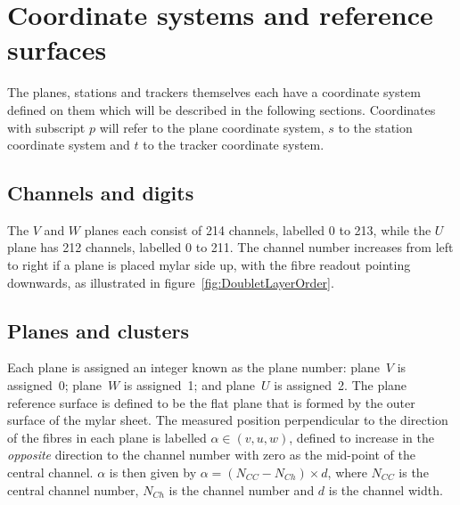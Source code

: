 \section{Coordinate systems and reference surfaces}
\label{sec:Coordinates}

  The planes, stations and trackers themselves each have a coordinate system defined on them which will be described in the following sections. Coordinates with subscript $p$ will refer to the plane coordinate system, $s$ to the station coordinate system and $t$ to the tracker coordinate system.

  \subsection{Channels and digits}
  The $V$ and $W$ planes each consist of 214 channels, labelled 0 to 213, while the $U$ plane has 212 channels, labelled 0 to 211.  The channel number increases from left to right if a plane is placed mylar side up, with the fibre readout pointing downwards, as illustrated in figure~\ref{fig:DoubletLayerOrder}.

  \subsection{Planes and clusters}
  \label{subsec:PlaneAndClusters}
  Each plane is assigned an integer known as the plane number: plane~$V$ is assigned~0; plane~$W$ is assigned~1; and plane~$U$ is assigned~2.  The plane reference surface is defined to be the flat plane that is formed by the outer surface of the mylar sheet. The measured position perpendicular to the direction of the fibres in each plane is labelled  $\alpha \in (v, u, w)$, defined to increase in the \textit{opposite} direction to the channel number with zero as the mid-point of the central channel. $\alpha$ is then given by $\alpha = \left(N_{CC} - N_{Ch}\right) \times d$, where $N_{CC}$ is the central channel number, $N_{Ch}$ is the channel number and $d$ is the channel width.
  
% 
  
